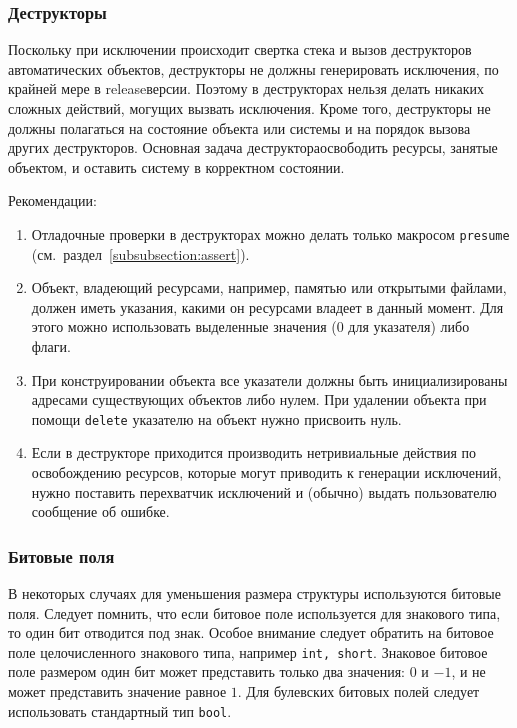 {{{%
\subsubsection{Деструкторы}

Поскольку при исключении происходит свертка стека и вызов деструкторов автоматических объектов, деструкторы не должны генерировать исключения, по крайней мере в release\sdash версии. Поэтому в деструкторах нельзя делать никаких сложных действий, могущих вызвать исключения. Кроме того, деструкторы не должны полагаться на состояние объекта или системы и на порядок вызова других деструкторов. Основная задача деструктора\mdash освободить ресурсы, занятые объектом, и оставить систему в корректном состоянии.

Рекомендации:

\begin{enumerate}
\item Отладочные проверки в деструкторах можно делать только макросом \lstinline|presume| (см.~раздел~\ref{subsubsection:assert}).
\item Объект, владеющий ресурсами, например, памятью или открытыми файлами, должен иметь указания, какими он ресурсами владеет в данный момент. Для этого можно использовать выделенные значения (0 для указателя) либо флаги.
\item При конструировании объекта все указатели должны быть инициализированы адресами существующих объектов либо нулем. При удалении объекта при помощи \lstinline|delete| указателю на объект нужно присвоить нуль.
\item Если в деструкторе приходится производить нетривиальные действия по освобождению ресурсов, которые могут приводить к генерации исключений, нужно поставить перехватчик исключений и (обычно) выдать пользователю сообщение об ошибке.
\end{enumerate}

\newpage
\subsubsection{Битовые поля}

В некоторых случаях для уменьшения размера структуры используются битовые поля. Следует помнить, что если битовое поле используется для знакового типа, то один бит отводится под знак. Особое внимание следует обратить на битовое поле целочисленного знакового типа, например \lstinline|int, short|. Знаковое битовое поле размером один бит может представить только два значения: $0$ и $-1$, и не может представить значение равное $1$. Для булевских битовых полей следует использовать стандартный тип \lstinline|bool|.

}}}
